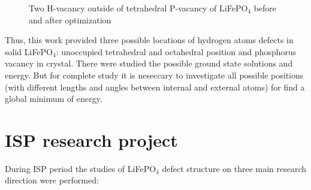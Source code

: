 \documentclass[11pt]{article}
\begin{document}
\begin{figure}[H]
\begin{minipage}[h]{0.48\linewidth}
\end{minipage}
\hfill
\begin{minipage}[h]{0.48\linewidth}
\end{minipage}
\caption{Two H-vacancy  outside of tetrahedral P-vacancy of LiFePO$_4$ before and after optimization}
\label{h31}
\end{figure}

Thus, this work provided three possible locations of hydrogen atoms defects in solid LiFePO$_4$: unoccupied tetrahedral and octahedral position and phosphorus vacancy in crystal. There were studied the possible ground state solutions and energy. But for complete study it is neseccary to investigate all possible positions (with different lengths and angles between internal and external atoms) for find a global minimum of energy.

\newpage

\section{ISP research project}

During ISP period the studies of LiFePO$_4$ defect structure on three main research direction were performed:
\end{document}
